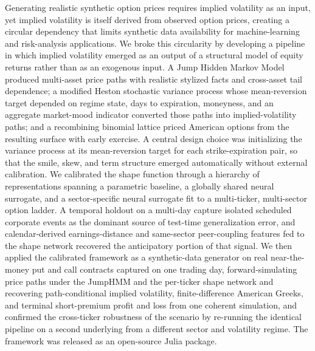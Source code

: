 Generating realistic synthetic option prices requires implied volatility as an input, yet implied volatility is itself derived from observed option prices, creating a circular dependency that limits synthetic data availability for machine-learning and risk-analysis applications. We broke this circularity by developing a pipeline in which implied volatility emerged as an output of a structural model of equity returns rather than as an exogenous input. A Jump Hidden Markov Model produced multi-asset price paths with realistic stylized facts and cross-asset tail dependence; a modified Heston stochastic variance process whose mean-reversion target depended on regime state, days to expiration, moneyness, and an aggregate market-mood indicator converted those paths into implied-volatility paths; and a recombining binomial lattice priced American options from the resulting surface with early exercise. A central design choice was initializing the variance process at its mean-reversion target for each strike-expiration pair, so that the smile, skew, and term structure emerged automatically without external calibration. We calibrated the shape function through a hierarchy of representations spanning a parametric baseline, a globally shared neural surrogate, and a sector-specific neural surrogate fit to a multi-ticker, multi-sector option ladder. A temporal holdout on a multi-day capture isolated scheduled corporate events as the dominant source of test-time generalization error, and calendar-derived earnings-distance and same-sector peer-coupling features fed to the shape network recovered the anticipatory portion of that signal. We then applied the calibrated framework as a synthetic-data generator on real near-the-money put and call contracts captured on one trading day, forward-simulating price paths under the JumpHMM and the per-ticker shape network and recovering path-conditional implied volatility, finite-difference American Greeks, and terminal short-premium profit and loss from one coherent simulation, and confirmed the cross-ticker robustness of the scenario by re-running the identical pipeline on a second underlying from a different sector and volatility regime. The framework was released as an open-source Julia package.
